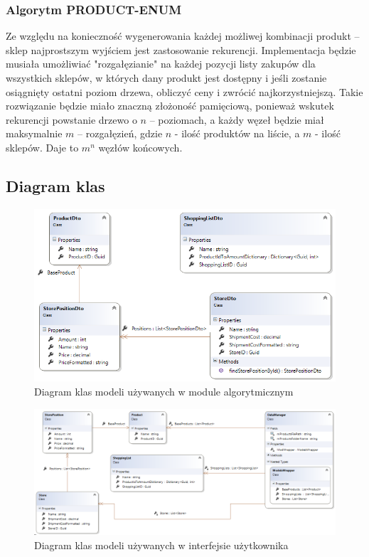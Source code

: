 \documentclass[a4paper]{article}
\begin{document}
\subsubsection{Algorytm PRODUCT-ENUM}
Ze względu na konieczność wygenerowania każdej możliwej kombinacji produkt – sklep najprostszym wyjściem jest zastosowanie rekurencji. Implementacja będzie musiała umożliwiać "rozgałęzianie" na każdej pozycji listy zakupów dla wszystkich sklepów, w których dany produkt jest dostępny i jeśli zostanie osiągnięty ostatni poziom drzewa, obliczyć ceny i zwrócić najkorzystniejszą. Takie rozwiązanie będzie miało znaczną złożoność pamięciową, ponieważ wskutek rekurencji powstanie drzewo o $n$ – poziomach, a każdy węzeł będzie miał maksymalnie $m$ – rozgałęzień, gdzie $n$ - ilość produktów na liście, a $m$ - ilość sklepów. Daje to $m^n$ węzłów końcowych.
\subsection{Diagram klas}
\begin{figure}[H]
\centering
\includegraphics[width=\textwidth,keepaspectratio]{img/diagram-dto.png}
\caption{Diagram klas modeli używanych w module algorytmicznym}
\end{figure}
\begin{figure}[H]
\centering
\includegraphics[width=\textwidth,keepaspectratio]{img/diagram-gui.png}
\caption{Diagram klas modeli używanych w interfejsie użytkownika}
\end{figure}
\end{document}
